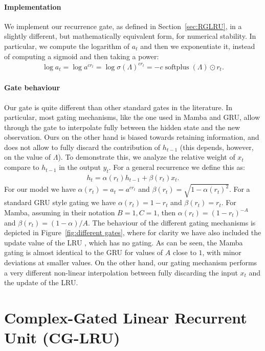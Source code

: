 \documentclass[11pt, a4paper, logo, onecolumn]{googledeepmind}
\DeclareMathOperator{\softplus}{softplus}
\theoremstyle{definition}
\begin{document}
\paragraph{Implementation}

We implement our recurrence gate, as defined in Section~\ref{sec:RGLRU}, in a slightly different, but mathematically equivalent form, for numerical stability. 
In particular, we compute the logarithm of $a_t$ and then we exponentiate it, instead of computing a sigmoid and then taking a power:
\begin{eqnarray}
\log a_t = \log a^{c r_t} = \log \sigma(\Lambda) ^ {cr_t} = - c \softplus(\Lambda) \odot r_t.
\end{eqnarray}

 \paragraph{Gate behaviour}
 
Our gate is quite different than other standard gates in the literature.
In particular, most gating mechanisms, like the one used in Mamba and GRU, allow through the gate to interpolate fully between the hidden state and the new observation. 
Ours on the other hand is biased towards retaining information, and does not allow to fully discard the contribution of $h_{t-1}$ (this depends, however, on the value of $\Lambda$). 
To demonstrate this, we analyze the relative weight of $x_t$ compare to $h_{t-1}$ in the output $y_t$.
For a general recurrence we define this as:
\begin{eqnarray}
h_t = \alpha(r_t) h_{t-1} + \beta(r_t) x_t.
\end{eqnarray}
For our model we have $\alpha(r_t) = a_t = a^{c r_t}$ and $\beta(r_t) = \sqrt{1 - \alpha(r_t)^2}$.
For a standard GRU style gating we have $\alpha(r_t) = 1 - r_t$ and $\beta(r_t) = r_t$.
For Mamba, assuming in their notation $B = 1, C=1$, then $\alpha(r_t) = (1 - r_t)^{-A}$ and $\beta(r_t) = (1 - \alpha) / A$.
The behaviour of the different gating mechanisms is depicted in Figure~\ref{fig:different gates}, where for clarity we have also included the update value of the LRU \citep{orvieto2023resurrecting}, which has no gating. 
As can be seen, the Mamba gating is almost identical to the GRU for values of $A$ close to $1$, with minor deviations at smaller values.
On the other hand, our gating mechanism performs a very different non-linear interpolation between fully discarding the input $x_t$ and the update of the LRU.

\section{Complex-Gated Linear Recurrent Unit (CG-LRU) }
\label{appendix:complex_lru}
\end{document}
